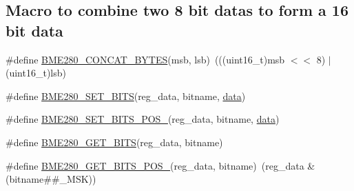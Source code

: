 \subsection*{Macro to combine two 8 bit data\textquotesingle{}s to form a 16 bit data}
\begin{DoxyCompactItemize}
\item 
\#define \hyperlink{group___b_m_e280_ga0202d632129238d5f788e362c19ccf93}{B\+M\+E280\+\_\+\+C\+O\+N\+C\+A\+T\+\_\+\+B\+Y\+T\+ES}(msb,  lsb)~(((uint16\+\_\+t)msb $<$$<$ 8) $\vert$ (uint16\+\_\+t)lsb)
\item 
\#define \hyperlink{group___b_m_e280_ga78f60fe8571e15f6a21ba8fcaa12e0ce}{B\+M\+E280\+\_\+\+S\+E\+T\+\_\+\+B\+I\+TS}(reg\+\_\+data,  bitname,  \hyperlink{structdata}{data})
\item 
\#define \hyperlink{group___b_m_e280_ga72c20c06b3a42de7660bf1d8678cd645}{B\+M\+E280\+\_\+\+S\+E\+T\+\_\+\+B\+I\+T\+S\+\_\+\+P\+O\+S\+\_}(reg\+\_\+data,  bitname,  \hyperlink{structdata}{data})
\item 
\#define \hyperlink{group___b_m_e280_gaa28698af242be4e59a2812ebe4165982}{B\+M\+E280\+\_\+\+G\+E\+T\+\_\+\+B\+I\+TS}(reg\+\_\+data,  bitname)
\item 
\#define \hyperlink{group___b_m_e280_ga2c4248bc9b39a806aca49e34b1a5636c}{B\+M\+E280\+\_\+\+G\+E\+T\+\_\+\+B\+I\+T\+S\+\_\+\+P\+O\+S\+\_}(reg\+\_\+data,  bitname)~(reg\+\_\+data \& (bitname\#\#\+\_\+\+M\+SK))
\end{DoxyCompactItemize}
